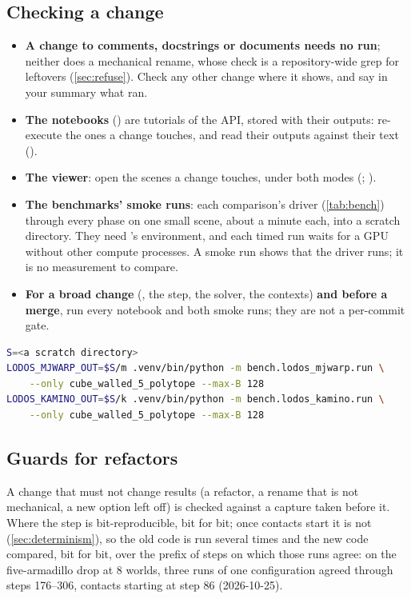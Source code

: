 \subsection{Checking a change}\label{sec:check}

\begin{itemize}
\item \textbf{A change to comments, docstrings or documents needs no run}; neither does a mechanical rename, whose check is a repository-wide grep for leftovers (\cref{sec:refuse}). Check any other change where it shows, and say in your summary what ran.
\item \textbf{The notebooks} () are tutorials of the API, stored with their outputs: re-execute the ones a change touches, and read their outputs against their text ().
\item \textbf{The viewer}: open the scenes a change touches, under both modes (; ).
\item \textbf{The benchmarks' smoke runs}: each comparison's driver (\cref{tab:bench}) through every phase on one small scene, about a minute each, into a scratch directory. They need 's environment, and each timed run waits for a GPU without other compute processes. A smoke run shows that the driver runs; it is no measurement to compare.
\item \textbf{For a broad change} (, the step, the solver, the contexts) \textbf{and before a merge}, run every notebook and both smoke runs; they are not a per-commit gate.
\end{itemize}

\begin{lstlisting}[language=bash]
S=<a scratch directory>
LODOS_MJWARP_OUT=$S/m .venv/bin/python -m bench.lodos_mjwarp.run \
    --only cube_walled_5_polytope --max-B 128
LODOS_KAMINO_OUT=$S/k .venv/bin/python -m bench.lodos_kamino.run \
    --only cube_walled_5_polytope --max-B 128
\end{lstlisting}

\subsection{Guards for refactors}\label{sec:guards}

A change that must not change results (a refactor, a rename that is not mechanical, a new option left off) is checked against a capture taken before it. Where the step is bit-reproducible, bit for bit; once contacts start it is not (\cref{sec:determinism}), so the old code is run several times and the new code compared, bit for bit, over the prefix of steps on which those runs agree: on the five-armadillo drop at 8 worlds, three runs of one configuration agreed through steps 176--306, contacts starting at step 86 (2026-10-25).

